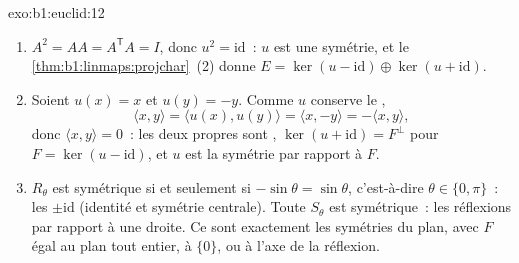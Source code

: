 \begin{solution}{exo:b1:euclid:12}
\begin{enumerate}
  \item $A^2 = A A = A^{\mathsf T} A = I$, donc $u^2 =
        \mathrm{id}$~: $u$ est une symétrie, et
        le \cref{thm:b1:linmaps:projchar}~(2) donne $E = \ker(u -
        \mathrm{id}) \oplus \ker(u + \mathrm{id})$.
  \item Soient $u(x) = x$ et $u(y) = -y$. Comme $u$ conserve le
        ,
        \[
        \langle x, y\rangle = \langle u(x), u(y)\rangle
        = \langle x, -y\rangle = -\langle x, y\rangle ,
        \]
        donc $\langle x, y\rangle = 0$~: les deux 
        propres sont , $\ker(u + \mathrm{id}) =
        F^\perp$ pour $F = \ker(u - \mathrm{id})$, et $u$ est la
        symétrie  par rapport à $F$.
  \item $R_\theta$ est symétrique si et seulement si $-\sin\theta
        = \sin\theta$, c'est-à-dire $\theta \in \{0, \pi\}$~: les
         $\pm\mathrm{id}$ (identité et symétrie
        centrale). Toute $S_\theta$ est symétrique~: les
        réflexions par rapport à une droite. Ce sont exactement
        les symétries  du plan, avec $F$ égal au plan
        tout entier, à $\{0\}$, ou à l'axe de la réflexion.
\end{enumerate}
\end{solution}

